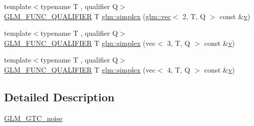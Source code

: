 \begin{DoxyCompactItemize}
\item 
{\footnotesize template$<$typename T , qualifier Q$>$ }\\\hyperlink{setup_8hpp_a33fdea6f91c5f834105f7415e2a64407}{G\+L\+M\+\_\+\+F\+U\+N\+C\+\_\+\+Q\+U\+A\+L\+I\+F\+I\+ER} T \hyperlink{namespaceglm_a09cb6ae89b52ee4c47e7b708b84e4d13}{glm\+::simplex} (\hyperlink{structglm_1_1vec}{glm\+::vec}$<$ 2, T, Q $>$ const \&\hyperlink{_s_d_l__opengl_8h_a10a82eabcb59d2fcd74acee063775f90}{v})
\item 
{\footnotesize template$<$typename T , qualifier Q$>$ }\\\hyperlink{setup_8hpp_a33fdea6f91c5f834105f7415e2a64407}{G\+L\+M\+\_\+\+F\+U\+N\+C\+\_\+\+Q\+U\+A\+L\+I\+F\+I\+ER} T \hyperlink{namespaceglm_a9647df123e68432133be68c141dbee4a}{glm\+::simplex} (vec$<$ 3, T, Q $>$ const \&\hyperlink{_s_d_l__opengl_8h_a10a82eabcb59d2fcd74acee063775f90}{v})
\item 
{\footnotesize template$<$typename T , qualifier Q$>$ }\\\hyperlink{setup_8hpp_a33fdea6f91c5f834105f7415e2a64407}{G\+L\+M\+\_\+\+F\+U\+N\+C\+\_\+\+Q\+U\+A\+L\+I\+F\+I\+ER} T \hyperlink{namespaceglm_ab64811bdfcbf5cbd222e3cb50119816a}{glm\+::simplex} (vec$<$ 4, T, Q $>$ const \&\hyperlink{_s_d_l__opengl_8h_a10a82eabcb59d2fcd74acee063775f90}{v})
\end{DoxyCompactItemize}


\subsection{Detailed Description}
\hyperlink{group__gtc__noise}{G\+L\+M\+\_\+\+G\+T\+C\+\_\+noise} 